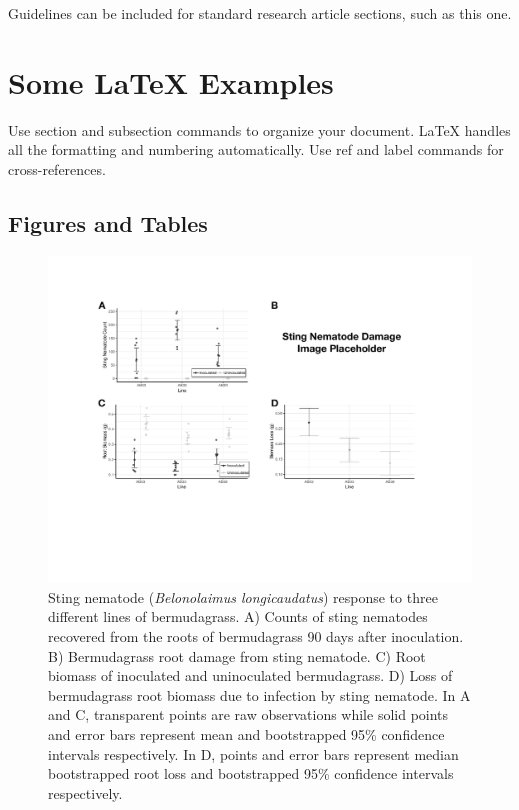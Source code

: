 \documentclass[9pt,lineno]{elife}
\begin{document}
Guidelines can be included for standard research article sections, such as this one. 

\lipsum[3]

\section{Some \LaTeX{} Examples}
\label{sec:examples}

Use section and subsection commands to organize your document. \LaTeX{} handles all the formatting and numbering automatically. Use ref and label commands for cross-references.

\subsection{Figures and Tables}

\begin{figure}
\begin{fullwidth}
\includegraphics[width=0.95\linewidth]{figures/publication_figures/figure-1.pdf}
\caption{Sting nematode (\textit{Belonolaimus longicaudatus}) response to three different lines of bermudagrass.  A) Counts of sting nematodes recovered from the roots of bermudagrass 90 days after inoculation.  B) Bermudagrass root damage from sting nematode.  C) Root biomass of inoculated and uninoculated bermudagrass.  D) Loss of bermudagrass root biomass due to infection by sting nematode.  In A and C, transparent points are raw observations while solid points and error bars represent mean and bootstrapped 95\% confidence intervals respectively.  In D, points and error bars represent median bootstrapped root loss and bootstrapped 95\% confidence intervals respectively.   }
\label{fig:figure1}
\end{fullwidth}
\end{figure}
\end{document}
